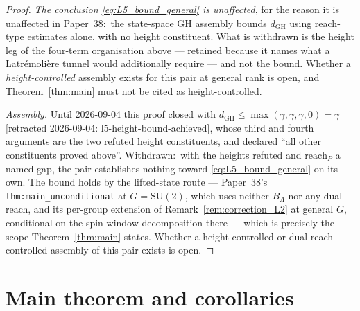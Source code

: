 \documentclass[11pt,a4paper]{article}
\theoremstyle{plain}
\theoremstyle{definition}
\newcommand{\Lammax}{\Lambda}
\newcommand{\SU}{\mathrm{SU}}
\begin{document}
\begin{proof}
\emph{The conclusion \eqref{eq:L5_bound_general} is unaffected}, for the
reason it is unaffected in Paper~38:\ the state-space GH assembly bounds
$d_{\mathrm{GH}}$ using reach-type estimates alone, with no height
constituent. What is withdrawn is the height leg of the four-term
organisation above --- retained because it names what a Latr\'emoli\`ere
tunnel would additionally require --- and not the bound. Whether a
\emph{height-controlled} assembly exists for this pair at general rank is
open, and Theorem~\ref{thm:main} must not be cited as height-controlled.

\emph{Assembly.} Until 2026-09-04 this proof closed with
$d_{\mathrm{GH}} \le \max(\gamma, \gamma, \gamma, 0) = \gamma$
[retracted 2026-09-04: l5-height-bound-achieved], whose third and fourth arguments are the two refuted
height constituents, and declared ``all other constituents proved
above''. Withdrawn:\ with the heights refuted and $\mathrm{reach}_P$ a
named gap, the pair establishes nothing toward
\eqref{eq:L5_bound_general} on its own. The bound holds by the
lifted-state route --- Paper~38's \texttt{thm:main\_unconditional} at
$G = \SU(2)$, which uses neither $B_\Lammax$ nor any dual reach, and its
per-group extension of Remark~\ref{rem:correction_L2} at general $G$,
conditional on the spin-window decomposition there --- which is
precisely the scope Theorem~\ref{thm:main} states. Whether a
height-controlled or dual-reach-controlled assembly of this pair exists
is open.
\end{proof}

\section{Main theorem and corollaries}\label{sec:main_theorem}
\end{document}
